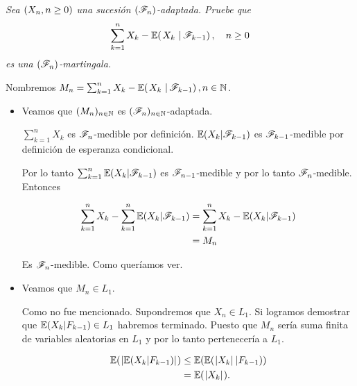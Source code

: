 \emph{
    Sea $\left( X_n,n\geq 0\right) $ una sucesi\'on $\left( \mathscr{F}_n\right) $-adaptada. Pruebe que
    \begin{align}
        \sum_{k=1}^n X_k-\espc{X_k}{\F_{k-1}}, \quad n\geq 0
    \end{align}
    es una $\left( \mathscr{F}_n\right) $-martingala.
}

\afterstatement\par\null

Nombremos $M_n = \sum_{k=1}^n X_k-\espc{X_k}{\F_{k-1}}, n \in \N$.\par\null

\begin{itemize}
	\item 
        Veamos que $(M_n)_{n \in \mathbb{N}}$ es $(\mathscr{F}_n)_{n \in \mathbb{N}}$-adaptada.\par\null
    
        $\sum_{k = 1}^n X_k$ es $\mathscr{F}_n$-medible por definición. $\mathbb{E}(X_k | \mathscr{F}_{k-1})$ es $\mathscr{F}_{k-1}$-medible por definición
        de esperanza condicional. \par\null
        
        Por lo tanto $\sum_{k = 1}^n \mathbb{E}(X_k | \mathscr{F}_{k-1})$ es $\mathscr{F}_{n-1}$-medible y por lo tanto
        $\mathscr{F}_n$-medible. Entonces
        
        \begin{align}
            \sum_{k = 1}^n X_k - \sum_{k = 1}^n \mathbb{E}(X_k | \mathscr{F}_{k-1}) &=  \sum_{k = 1}^n X_k - \mathbb{E}(X_k | \mathscr{F}_{k-1})    \\
                                                                    &=  M_n   
        \end{align}\par\null
    
        Es $\mathscr{F}_n$-medible. Como queríamos ver.\par\null
        
    \item
        Veamos que $M_n \in L_1$.\par\null
        
        Como no fue mencionado. Supondremos que $X_n \in L_1$. Si logramos demostrar que $\mathbb{E}(X_k | F_{k-1}) \in L_1$ habremos terminado.
        Puesto que $M_n$ sería suma finita de variables aleatorias en $L_1$ y por lo tanto pertenecería a $L_1$.\par\null
        
        \begin{align}
            \mathbb{E}(\hspace{.25mm}\left|\mathbb{E}(X_k | F_{k-1})\right|\hspace{.25mm})     &\leq   \mathbb{E}(\mathbb{E}(\hspace{.25mm}\left|X_k\right|\hspace{.25mm} | F_{k-1})) \\
                                            &=      \mathbb{E}(\hspace{.25mm}\left|X_k\right|\hspace{.25mm}). 
        \end{align}
        

\end{itemize}
